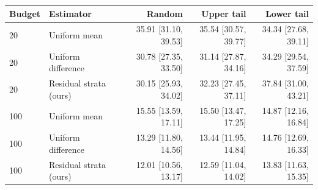 \begin{tabular}{llrrr}
\toprule
Budget & Estimator & Random & Upper tail & Lower tail \\
\midrule
20 & Uniform mean & 35.91 [31.10, 39.53] & 35.54 [30.57, 39.77] & 34.34 [27.68, 39.11] \\
20 & Uniform difference & 30.78 [27.35, 33.50] & 31.14 [27.87, 34.16] & 34.29 [29.54, 37.59] \\
20 & Residual strata (ours) & 30.15 [25.93, 34.02] & 32.23 [27.45, 37.11] & 37.84 [31.00, 43.21] \\
100 & Uniform mean & 15.55 [13.59, 17.11] & 15.50 [13.47, 17.25] & 14.87 [12.16, 16.84] \\
100 & Uniform difference & 13.29 [11.80, 14.56] & 13.44 [11.95, 14.84] & 14.76 [12.69, 16.33] \\
100 & Residual strata (ours) & 12.01 [10.56, 13.17] & 12.59 [11.04, 14.02] & 13.83 [11.63, 15.35] \\
\bottomrule
\end{tabular}